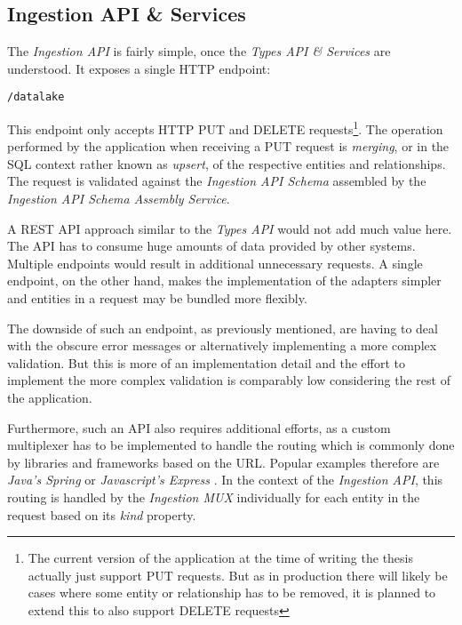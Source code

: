 \subsection{Ingestion API \& Services}
The \emph{Ingestion API} is fairly simple, once the \emph{Types API \& Services} are understood. It exposes a single HTTP endpoint:

\begin{lstlisting}[caption=Ingestion API Endpoint, captionpos=b, label=lst:IngestionEndpoint]
/datalake
\end{lstlisting}

This endpoint only accepts HTTP PUT and DELETE requests\footnote{The current version of the application at the time of writing the thesis actually just support PUT requests. But as in production there will likely be cases where some entity or relationship has to be removed, it is planned to extend this to also support DELETE requests}. The operation performed by the application when receiving a PUT request is \emph{merging}, or in the SQL context rather known as \emph{upsert}, of the respective entities and relationships. The request is validated against the \emph{Ingestion API Schema} assembled by the \emph{Ingestion API Schema Assembly Service}.\par 
A REST API approach similar to the \emph{Types API} would not add much value here. The API has to consume huge amounts of data provided by other systems. Multiple endpoints would result in additional unnecessary requests. A single endpoint, on the other hand, makes the implementation of the adapters simpler and entities in a request may be bundled more flexibly.\par
The downside of such an endpoint, as previously mentioned, are having to deal with the obscure error messages or alternatively implementing a more complex validation. But this is more of an implementation detail and the effort to implement the more complex validation is comparably low considering the rest of the application.\par
Furthermore, such an API also requires additional efforts, as a custom multiplexer has to be implemented to handle the routing which is commonly done by libraries and frameworks based on the URL. Popular examples therefore are \emph{Java's Spring} \cite{Spring} or \emph{Javascript's Express} \cite{Express}. In the context of the \emph{Ingestion API}, this routing is handled by the \emph{Ingestion MUX} individually for each entity in the request based on its \emph{kind} property. 

